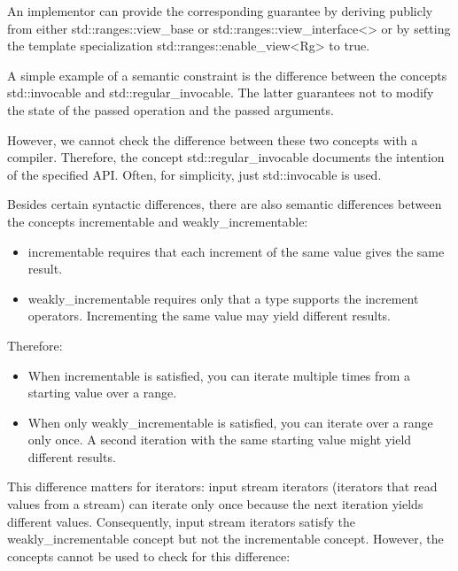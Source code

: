 An implementor can provide the corresponding guarantee by deriving publicly from either std::ranges::view\_base or std::ranges::view\_interface<> or by setting the template specialization std::ranges::enable\_view<Rg> to true.


A simple example of a semantic constraint is the difference between the concepts std::invocable and std::regular\_invocable. The latter guarantees not to modify the state of the passed operation and the passed arguments.

However, we cannot check the difference between these two concepts with a compiler. Therefore, the concept std::regular\_invocable documents the intention of the specified API. Often, for simplicity, just std::invocable is used.


Besides certain syntactic differences, there are also semantic differences between the concepts incrementable and weakly\_incrementable:

\begin{itemize}
\item
incrementable requires that each increment of the same value gives the same result.

\item
weakly\_incrementable requires only that a type supports the increment operators. Incrementing the same value may yield different results.
\end{itemize}

Therefore:

\begin{itemize}
\item
When incrementable is satisfied, you can iterate multiple times from a starting value over a range.

\item
When only weakly\_incrementable is satisfied, you can iterate over a range only once. A second iteration with the same starting value might yield different results.
\end{itemize}

This difference matters for iterators: input stream iterators (iterators that read values from a stream) can iterate only once because the next iteration yields different values. Consequently, input stream iterators satisfy the weakly\_incrementable concept but not the incrementable concept. However, the concepts cannot be used to check for this difference:

